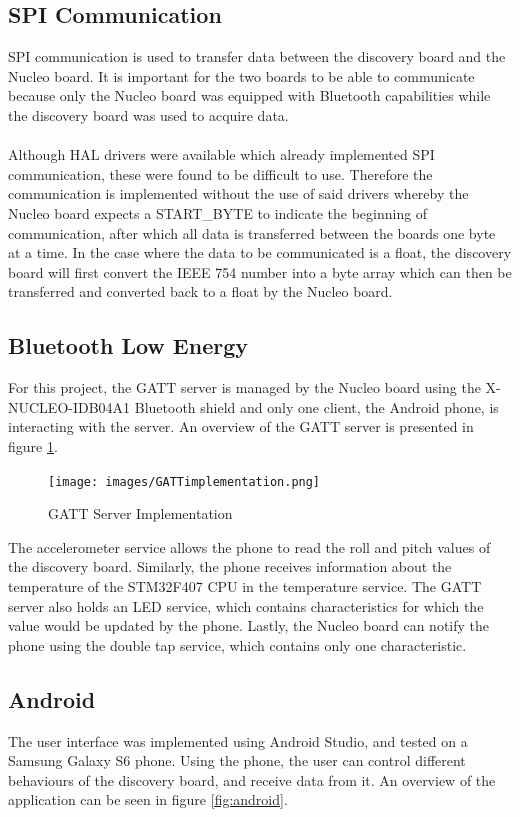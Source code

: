 \documentclass[12pt]{article}
\begin{document}
\subsection{SPI Communication}
SPI communication is used to transfer data between the discovery board and the Nucleo board. It is important for the two boards to be able to communicate because only the Nucleo board was equipped with Bluetooth capabilities while the discovery board was used to acquire data.
\paragraph{}
Although HAL drivers were available which already implemented SPI communication, these were found to be difficult to use. Therefore the communication is implemented without the use of said drivers whereby the Nucleo board expects a START\_BYTE to indicate the beginning of communication, after which all data is transferred between the boards one byte at a time. In the case where the data to be communicated is a float, the discovery board will first convert the IEEE 754 number into a byte array which can then be transferred and converted back to a float by the Nucleo board.

\subsection{Bluetooth Low Energy}
For this project, the GATT server is managed by the Nucleo board using the X-NUCLEO-IDB04A1 Bluetooth shield and only one client, the Android phone, is interacting with the server. An overview of the GATT server is presented in figure \ref{fig:gattimp}.

\begin{figure}[!htb]
 \centering
 \texttt{[image: images/GATTimplementation.png]}
 \caption{GATT Server Implementation}
 \label{fig:gattimp}
\end{figure}

The accelerometer service allows the phone to read the roll and pitch values of the discovery board. Similarly, the phone receives information about the temperature of the STM32F407 CPU in the temperature service. The GATT server also holds an LED service, which contains characteristics for which the value would be updated by the phone. Lastly, the Nucleo board can notify the phone using the double tap service, which contains only one characteristic.

\subsection{Android}
The user interface was implemented using Android Studio, and tested on a Samsung Galaxy S6 phone. Using the phone, the user can control different behaviours of the discovery board, and receive data from it. An overview of the application can be seen in figure \ref{fig:android}.
\end{document}
